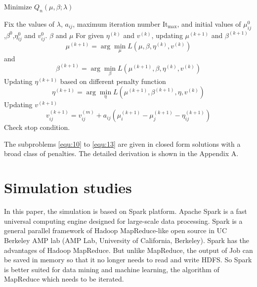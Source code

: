 \documentclass[review]{elsarticle}
\begin{document}
 \begin{algorithm}[H]
 	\label{alg:2}
 	\caption{Minimize $Q_n(\mu,\beta;\lambda)$}
 	\begin{algorithmic}[1]
 		\REQUIRE
 		Fix the values of $\lambda$, $a_{ij}$,  maximum iteration number $\textrm{It}_{\max}$, and initial values of  $\mu_{ij}^0$,$\beta^0$,$\eta_{ij}^0$ and $v_{ij}^0$.
 		\ENSURE $\beta$ and $\mu$
 		\STATE For given $\eta^{(k)}$ and $v^{(k)}$, updating $\mu^{(k+1)}$ and $\beta^{(k+1)}$
 		\begin{equation}\label{equ:10}
 		\mu^{(k+1)} = \arg\min_{\mu}L(\mu,\beta,\eta^{(k)},v^{(k)})
 		\end{equation}
 		and
 		\begin{equation}\label{equ:11}
 		\beta^{(k+1)} = \arg\min_{\beta}L(\mu^{(k+1)},\beta,\eta^{(k)},v^{(k)})
 		\end{equation}
 		\STATE Updating $\eta^{(k+1)}$ based on different penalty function
 		\begin{equation}\label{equ:12}
 		\eta^{(k+1)} = \arg\min_{\eta}L(\mu^{(k+1)},\beta^{(k+1)},\eta,v^{(k)})
 		\end{equation}
 		\STATE Updating $v^{(k+1)}$
 		\begin{equation}\label{equ:13}
 		v_{ij}^{(k+1)}=v_{ij}^{(m)} + a_{ij}(\mu_i^{(k+1)}-\mu_j^{(k+1)}-\eta_{ij}^{(k+1)})
 		\end{equation}
 		\STATE Check stop condition.
 		\ENDFOR
 	\end{algorithmic}
 \end{algorithm}
The subproblems \ref{equ:10} to \ref{equ:13} are given in closed form solutions with a broad class of penalties. 
The detailed derivation is shown in the Appendix A.
\section{Simulation studies}\label{sec:4}
In this paper, the simulation is based on Spark platform. Apache Spark is a fast universal computing engine designed for large-scale data processing. Spark is a general parallel framework of Hadoop MapReduce-like open source in UC Berkeley AMP lab (AMP Lab, University of California, Berkeley). Spark has the advantages of Hadoop MapReduce. But unlike MapReduce, the output of Job can be saved in memory so that it no longer needs to read and write HDFS. So Spark is better suited for data mining and machine learning, the algorithm of MapReduce which needs to be iterated.
\end{document}
